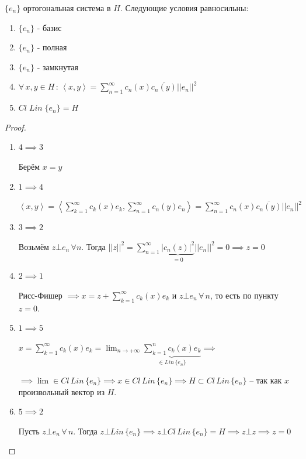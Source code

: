 \begin{theorem}
    $\{ e_n \}$ ортогональная система в $H$. Следующие условия равносильны:

    \begin{enumerate}
        \item $\{ e_n \}$ - базис
        \item $\{ e_n \}$ - полная
        \item $\{ e_n \}$ - замкнутая 
        \item $\forall \, x, y \in H \, : \, \left < x, y \right > = \sum_{n = 1}^\infty c_n (x) \overline{c_n (y)} ||e_n||^2$
        \item $Cl \; Lin \; \{ e_n \} = H$
    \end{enumerate}
\end{theorem}

\begin{proof}
    \begin{enumerate}
        \item {
            $4 \implies 3$

            Берём $x = y$
        }
        \item {
            $1 \implies 4$

            $\left < x, y \right > = \left < \sum_{k = 1}^\infty c_k(x) e_k, \sum_{n = 1}^\infty c_n (y) e_n \right > = \sum_{n = 1}^\infty c_n(x) \overline{c_n(y)} ||e_n||^2$
        }
        \item {
            $3 \implies 2$

            Возьмём $z \bot e_n \, \forall n$. Тогда $||z||^2 = \sum_{n = 1}^\infty \underbrace{|c_n (z)|^2}_{= 0} ||e_n||^2 = 0 \implies z = 0$
        }
        \item {
            $2 \implies 1$

            Рисс-Фишер $\implies x = z + \sum_{k = 1}^\infty c_k (x) e_k$ и $z \bot e_n \, \forall \, n$, то есть по пункту $z=0$.
        }
        \item {
            $1 \implies 5$

            $x = \sum_{k = 1}^\infty c_k (x) e_k = \lim_{n \to +\infty} \underbrace{\sum_{k = 1}^n c_k (x) e_k}_{\in Lin \, \{ e_n \}} \implies$
            
            $\implies \lim \in Cl \, Lin \, \{ e_n \} \implies x \in Cl \, Lin \, \{ e_n \} \implies H \subset Cl \, Lin \, \{ e_n \}$ -- так как $x$ произвольный вектор из $H$.
        }
        \item {
            $5 \implies 2$

            Пусть $z \bot e_n \, \forall \, n$. Тогда $z \bot Lin \, \{ e_n \} \implies z \bot Cl \, Lin \, \{ e_n \} = H \implies z \bot z \implies z = 0$
        }
    \end{enumerate}
\end{proof}

